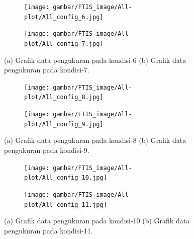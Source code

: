\begin{figure}[H]
	\begin{subfigure}{0.49\textwidth}
		\centering
		\texttt{[image: gambar/FTIS\_image/All-plot/All\_config\_6.jpg]}
		\caption{}
		\label{fig:condition_6}
	\end{subfigure}
	\centering
	\begin{subfigure}{0.49\textwidth}
		\centering
		\texttt{[image: gambar/FTIS\_image/All-plot/All\_config\_7.jpg]}
		\caption{}
		\label{fig:condition_7}
	\end{subfigure}
	\caption{(a) Grafik data pengukuran pada kondisi-6 (b) Grafik data pengukuran pada kondisi-7.}
\end{figure}

\begin{figure}[H]
	\begin{subfigure}{0.49\textwidth}
		\centering
		\texttt{[image: gambar/FTIS\_image/All-plot/All\_config\_8.jpg]}
		\caption{}
		\label{fig:condition_8}
	\end{subfigure}
	\centering
	\begin{subfigure}{0.49\textwidth}
		\centering
		\texttt{[image: gambar/FTIS\_image/All-plot/All\_config\_9.jpg]}
		\caption{}
		\label{fig:condition_9}
	\end{subfigure}
	\caption{(a) Grafik data pengukuran pada kondisi-8 (b) Grafik data pengukuran pada kondisi-9.}
\end{figure}

\begin{figure}[H]
	\begin{subfigure}{0.49\textwidth}
		\centering
		\texttt{[image: gambar/FTIS\_image/All-plot/All\_config\_10.jpg]}
		\caption{}
		\label{fig:condition_10}
	\end{subfigure}
	\centering
	\begin{subfigure}{0.49\textwidth}
		\centering
		\texttt{[image: gambar/FTIS\_image/All-plot/All\_config\_11.jpg]}
		\caption{}
		\label{fig:condition_11}
	\end{subfigure}
	\caption{(a) Grafik data pengukuran pada kondisi-10 (b) Grafik data pengukuran pada kondisi-11.}
\end{figure}

